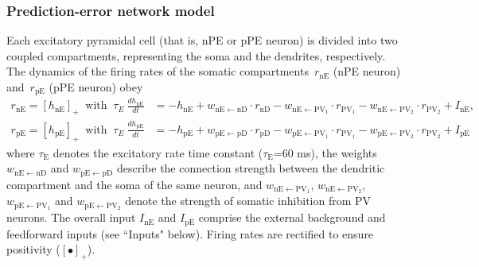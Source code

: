 \documentclass[10pt,a4paper,draft]{article}
\begin{document}
\subsubsection{Prediction-error network model}
%
Each excitatory pyramidal cell (that is, nPE or pPE neuron) is divided into two coupled compartments, representing the soma and the dendrites, respectively. The dynamics of the firing rates of the somatic compartments~$r_{\mathrm{nE}}$ (nPE neuron) and~$r_{\mathrm{pE}}$ (pPE neuron) obey \citep{wilson1972excitatory}
%
\begin{align}
r_\mathrm{nE} = [h_\mathrm{nE}]_+ \ \mbox{ with }\ \tau_E\ \frac{dh_\mathrm{nE}}{dt} &= - h_\mathrm{nE} + w_\mathrm{nE\leftarrow nD}\cdot  r_\mathrm{nD}  -  w_\mathrm{nE\leftarrow PV_1}\cdot r_\mathrm{PV_1}  -  w_\mathrm{nE\leftarrow PV_2}\cdot r_\mathrm{PV_2} + I_\mathrm{nE}, \nonumber\\
r_\mathrm{pE} = [h_\mathrm{pE}]_+ \ \mbox{ with }\ \tau_E\ \frac{dh_\mathrm{pE}}{dt} &= - h_\mathrm{pE} + w_\mathrm{pE\leftarrow pD}\cdot  r_\mathrm{pD}  -  w_\mathrm{pE\leftarrow PV_1}\cdot r_\mathrm{PV_1}  -  w_\mathrm{pE\leftarrow PV_2}\cdot r_\mathrm{PV_2} + I_\mathrm{pE}
\end{align}
%
where $\tau_\mathrm{E}$ denotes the excitatory rate time constant ($\tau_\mathrm{E}$=60 ms), the weights $w_{\mathrm{nE\leftarrow nD}}$ and $w_{\mathrm{pE\leftarrow pD}}$ describe the connection strength between the dendritic compartment and the soma of the same neuron, and $w_{\mathrm{nE\leftarrow PV_1}}$, $w_{\mathrm{nE\leftarrow PV_2}}$, $w_{\mathrm{pE\leftarrow PV_1}}$ and $w_{\mathrm{pE\leftarrow PV_2}}$ denote the strength of somatic inhibition from PV neurons. The overall input $I_\mathrm{nE}$ and $I_\mathrm{pE}$ comprise the external background and feedforward inputs (see ``Inputs" below). Firing rates are rectified to ensure positivity ($[\bullet]_+$). 
\end{document}
